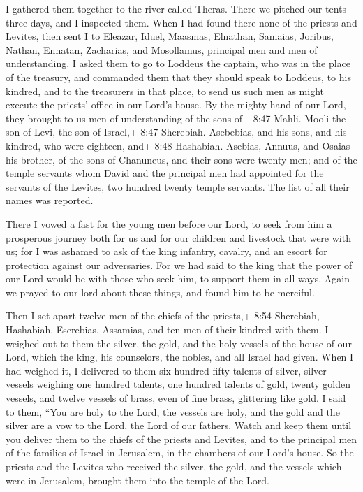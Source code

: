  I gathered them together to the river called Theras. There
we pitched our tents three days, and I inspected them. 
When I had found there none of the priests and Levites, 
then sent I to Eleazar, Iduel, Maasmas,  Elnathan, Samaias,
Joribus, Nathan, Ennatan, Zacharias, and Mosollamus, principal men and
men of understanding.  I asked them to go to Loddeus the
captain, who was in the place of the treasury,  and
commanded them that they should speak to Loddeus, to his kindred, and to
the treasurers in that place, to send us such men as might execute the
priests' office in our Lord's house.  By the mighty hand of
our Lord, they brought to us men of understanding of the sons of+ 8:47
Mahli. Mooli the son of Levi, the son of Israel,+ 8:47 Sherebiah.
Asebebias, and his sons, and his kindred, who were eighteen,
 and+ 8:48 Hashabiah. Asebias, Annuus, and Osaias his
brother, of the sons of Chanuneus, and their sons were twenty men;
 and of the temple servants whom David and the principal
men had appointed for the servants of the Levites, two hundred twenty
temple servants. The list of all their names was reported.

 There I vowed a fast for the young men before our Lord, to
seek from him a prosperous journey both for us and for our children and
livestock that were with us;  for I was ashamed to ask of
the king infantry, cavalry, and an escort for protection against our
adversaries.  For we had said to the king that the power of
our Lord would be with those who seek him, to support them in all ways.
 Again we prayed to our lord about these things, and found
him to be merciful.

 Then I set apart twelve men of the chiefs of the priests,+
8:54 Sherebiah, Hashabiah. Eserebias, Assamias, and ten men of their
kindred with them.  I weighed out to them the silver, the
gold, and the holy vessels of the house of our Lord, which the king, his
counselors, the nobles, and all Israel had given.  When I
had weighed it, I delivered to them six hundred fifty talents of silver,
silver vessels weighing one hundred talents, one hundred talents of
gold,  twenty golden vessels, and twelve vessels of brass,
even of fine brass, glittering like gold.  I said to them,
``You are holy to the Lord, the vessels are holy, and the gold and the
silver are a vow to the Lord, the Lord of our fathers. 
Watch and keep them until you deliver them to the chiefs of the priests
and Levites, and to the principal men of the families of Israel in
Jerusalem, in the chambers of our Lord's house.  So the
priests and the Levites who received the silver, the gold, and the
vessels which were in Jerusalem, brought them into the temple of the
Lord.

